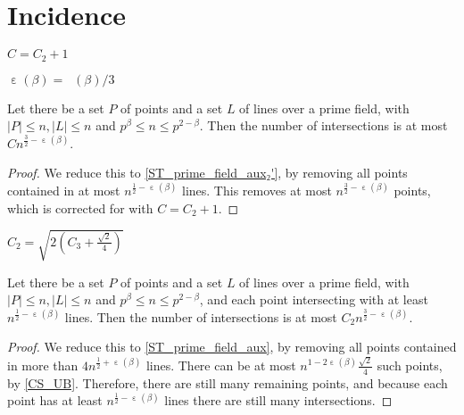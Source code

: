 \chapter{Incidence}
\label{chap:inc}

\DeclareMathOperator{\stpfone}{\varepsilon}
\DeclareMathOperator{\stpftwo}{\varepsilon_2}
\DeclareMathOperator{\sgone}{\varepsilon'}

\begin{definition}
    \label{ST_C}
    \leanok
    $C = C_2 + 1$
\end{definition}

\begin{definition}
    \leanok
    $\stpfone(\beta) = \stpftwo(\beta) / 3$
\end{definition}

\begin{theorem}
    \label{ST_prime_field}
    \leanok
    Let there be a set $P$ of points and a set $L$ of lines over a prime field, 
    with $|P| \leq n, |L| \leq n$ and $p^\beta \leq n \leq p^{2 - \beta}$.
    Then the number of intersections is at most $ C n^{\frac32 - \stpfone(\beta)} $.
\end{theorem}

\begin{proof}
    \leanok
    We reduce this to \ref{ST_prime_field_aux₂'}, by removing all points contained in at most
    $n^{\frac12 - \stpfone(\beta)}$ lines. This removes at most $n^{\frac32 - \stpfone(\beta)}$
    points, which is corrected for with $C = C_2 + 1$.
\end{proof}

\begin{definition}
    \label{ST_C2}
    \leanok
    $C_2 = \sqrt{2(C_3 + \frac{\sqrt2}4)}$
\end{definition}

\begin{theorem}
    \label{ST_prime_field_aux₂'}
    \leanok
    Let there be a set $P$ of points and a set $L$ of lines over a prime field, 
    with $|P| \leq n, |L| \leq n$ and $p^\beta \leq n \leq p^{2 - \beta}$,
    and each point intersecting with at least $n^{\frac12 - \stpfone(\beta)}$ lines.
    Then the number of intersections is at most $C_2 n^{\frac32 - \stpfone(\beta)}$.
\end{theorem}

\begin{proof}
    \leanok
    We reduce this to \ref{ST_prime_field_aux}, by removing all points contained in more than 
    $4 n^{\frac12 + \stpfone(\beta)}$ lines. There can be at most
    $n^{1 - 2 \stpfone(\beta)} \frac{\sqrt2}4$ such points, by \ref{CS_UB}.
    Therefore, there are still many remaining points, and because each point has at least
    $n^{\frac12 - \stpfone(\beta)}$ lines there are still many intersections.
\end{proof}

